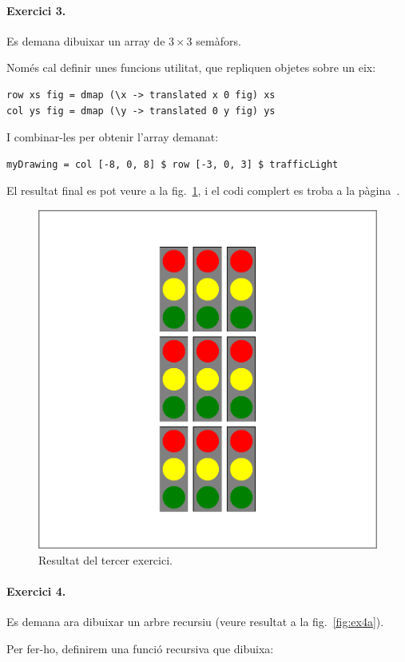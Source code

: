 \documentclass[catalan, a4paper]{scrartcl}
\begin{document}
\paragraph{Exercici 3.} Es demana dibuixar un array de $3 \times 3$ semàfors.


Només cal definir unes funcions utilitat, que repliquen objetes sobre un eix:

\begin{verbatim}
row xs fig = dmap (\x -> translated x 0 fig) xs
col ys fig = dmap (\y -> translated 0 y fig) ys
\end{verbatim}

I combinar-les per obtenir l'array demanat:

\begin{verbatim}
myDrawing = col [-8, 0, 8] $ row [-3, 0, 3] $ trafficLight
\end{verbatim}

El resultat final es pot veure a la fig.~\ref{fig:ex3}, i el codi complert
es troba a la pàgina~\pageref{code-ex3}.

\begin{figure}
\centering
\includegraphics[width=0.5\columnwidth]{../p2/ex3.pdf}
\caption{\label{fig:ex3} Resultat del tercer exercici.}
\end{figure}

\paragraph{Exercici 4.}

Es demana ara dibuixar un arbre recursiu (veure resultat a la
fig.~\ref{fig:ex4a}).

Per fer-ho, definirem una funció recursiva que dibuixa:
\end{document}
